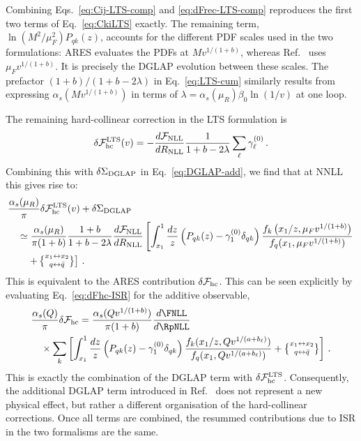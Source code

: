 Combining Eqs.~\eqref{eq:Cij-LTS-comp} and
\eqref{eq:dFrec-LTS-comp} reproduces the first two terms of
Eq.~\eqref{eq:CkiLTS} exactly. The remaining term,
$\ln(M^2/\mu_F^2)P_{qk}(z)$, accounts for the different PDF scales used
in the two formulations: \textsc{ARES} evaluates the PDFs at
$Mv^{1/(1+b)}$, whereas Ref.~\cite{vanBeekveld:2025zjh} uses
$\mu_Fv^{1/(1+b)}$. It is precisely the DGLAP evolution between these
scales. The prefactor $(1+b)/(1+b-2\lambda)$ in
Eq.~\eqref{eq:LTS-cum} similarly results from expressing
$\alpha_s(Mv^{1/(1+b)})$ in terms of
$\lambda=\alpha_s(\mu_R)\beta_0\ln(1/v)$ at one loop.

The remaining hard-collinear correction in the LTS formulation is
\begin{equation}
\label{eq:dFhc-LTS}
\delta\mathcal{F}^{\rm LTS}_{\mathrm{hc}}(v)
=-\frac{d\mathcal{F}_{\rm NLL}}{dR_{\rm NLL}}
\frac{1}{1+b-2\lambda}
\sum_{\ell}\gamma_\ell^{(0)}\,.
\end{equation}
Combining this with $\delta\Sigma_{\rm DGLAP}$ in Eq.~\eqref{eq:DGLAP-add}, we find that at NNLL this gives rise to:
\begin{align}
	&\frac{\alpha_s(\mu_R)}{\pi}\delta\mathcal{F}^{\rm LTS}_{\mathrm{hc}}(v)+
	\delta\Sigma_{\rm DGLAP}\nonumber\\
	&\quad\simeq\frac{\alpha_s(\mu_R)}{\pi(1+b)}\frac{1+b}{1+b-2\lambda}\frac{d\mathcal{F}_{\rm NLL}}{dR_{\rm NLL}}\left[\int_{x_1}^1\frac{dz}{z}\left(P_{qk}(z)-\gamma^{(0)}_1\delta_{qk}\right)
\frac{f_k\left(x_1/z,\mu_F v^{1/(1+b)}\right)}{f_{ q}(x_{1},\mu_F v^{1/(1+b)})}\right.\nonumber\\
&\qquad\left.+ \left\{\substack{x_1\leftrightarrow x_2\\[0.5ex] q\leftrightarrow\bar{q}}\right\}
\right]\,.
\end{align}
This is equivalent to the \textsc{ARES} contribution
$\delta\mathcal{F}_{\rm hc}$. This can be seen explicitly by evaluating
Eq.~\eqref{eq:dFhc-ISR} for the additive observable,
\begin{align}
	&\frac{\alpha_s(Q)}{\pi}\delta\mathcal{F}_{\rm hc}={}\frac{\alpha_s(Qv^{1/(1+b)})}{\pi(1+b)}\frac{d\FNLL}{d\RpNLL}\nonumber\\
	&\quad\times\sum_k \left[\int_{x_1}^1 \frac{dz}{z} \left(P_{qk}(z)-\gamma_1^{(0)}\delta_{qk}\right) \frac{f_k(x_{1}/z,Qv^{1/(a+b_\ell)})}{f_q(x_1,Qv^{1/(a+b_\ell)})}+\left\{\substack{x_1\leftrightarrow x_2\\[0.5ex] q\leftrightarrow\bar{q}}\right\}\right]\,.
\end{align}
This is exactly the combination of the DGLAP term with $\delta\mathcal{F}_{\rm hc}^{\rm LTS}$. Consequently, the
additional DGLAP term introduced in
Ref.~\cite{vanBeekveld:2025zjh} does not represent a new physical effect, but rather a different organisation of the hard-collinear corrections. Once all terms are combined, the resummed contributions due to ISR in the two formalisms are the same.

